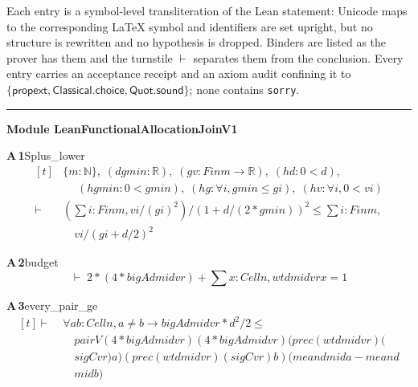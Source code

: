 \documentclass[conference]{IEEEtran}
\theoremstyle{definition}
\newcommand{\lean}[1]{\textsf{\footnotesize #1}}
\begin{document}
Each entry is a symbol-level transliteration of the Lean statement: Unicode maps to the corresponding \LaTeX{} symbol and identifiers are set upright, but no structure is rewritten and no hypothesis is dropped. Binders are listed as the prover has them and the turnstile $\vdash$ separates them from the conclusion. Every entry carries an acceptance receipt and an axiom audit confining it to $\{\textsf{propext},\textsf{Classical.choice},\textsf{Quot.sound}\}$; none contains \texttt{sorry}.

\vspace{4pt}\noindent\rule{\columnwidth}{0.4pt}\par\vspace{2pt}
\noindent\textbf{Module \lean{LeanFunctionalAllocationJoinV1}}\par\vspace{3pt}

\noindent\textbf{A\,1}\quad\lean{Splus\_lower}
{\footnotesize\[ \begin{aligned}[t]
&\{ \mathit{m} : \mathbb{N} \},\; (\mathit{d} \mathit{gmin} : \mathbb{R} ),\; (\mathit{g} \mathit{v} : \mathit{Fin} \mathit{m} \to \mathbb{R} ),\; (\mathit{hd} : 0 < \mathit{d}),\\
&\quad \; (\mathit{hgmin} : 0 < \mathit{gmin}),\; (\mathit{hg} : \forall \mathit{i}, \mathit{gmin} \leq \mathit{g} \mathit{i}),\; (\mathit{hv} : \forall \mathit{i}, 0 < \mathit{v} \mathit{i})\\
\vdash\;&(\textstyle\sum \mathit{i} : \mathit{Fin} \mathit{m}, \mathit{v} \mathit{i} / (\mathit{g} \mathit{i}) ^{2}) / (1 + \mathit{d} / (2 * \mathit{gmin})) ^{2} \leq \textstyle\sum \mathit{i} : \mathit{Fin} \mathit{m},\\
&\quad \mathit{v} \mathit{i} / (\mathit{g} \mathit{i} + \mathit{d} / 2) ^{2}
\end{aligned} \]}

\noindent\textbf{A\,2}\quad\lean{budget}
{\footnotesize\[ \vdash\; 2 * (4 * \mathit{bigA} \mathit{d} \mathit{mid} \mathit{vr}) + \textstyle\sum \mathit{x} : \mathit{Cell} \mathit{n}, \mathit{wt} \mathit{d} \mathit{mid} \mathit{vr} \mathit{x} = 1 \]}

\noindent\textbf{A\,3}\quad\lean{every\_pair\_ge}
{\footnotesize\[ \begin{aligned}[t]
\vdash\;&\forall \mathit{a} \mathit{b} : \mathit{Cell} \mathit{n}, \mathit{a} \neq \mathit{b} \to \mathit{bigA} \mathit{d} \mathit{mid} \mathit{vr} * \mathit{d} ^{2} / 2 \leq\\
&\quad \mathit{pairV} (4 * \mathit{bigA} \mathit{d} \mathit{mid} \mathit{vr}) (4 * \mathit{bigA} \mathit{d} \mathit{mid} \mathit{vr}) (\mathit{prec} (\mathit{wt} \mathit{d} \mathit{mid} \mathit{vr}) (\\
&\quad \mathit{sigC} \mathit{vr}) \mathit{a}) (\mathit{prec} (\mathit{wt} \mathit{d} \mathit{mid} \mathit{vr}) (\mathit{sigC} \mathit{vr}) \mathit{b}) (\mathit{mean} \mathit{d} \mathit{mid} \mathit{a} - \mathit{mean} \mathit{d}\\
&\quad \mathit{mid} \mathit{b})
\end{aligned} \]}
\end{document}
